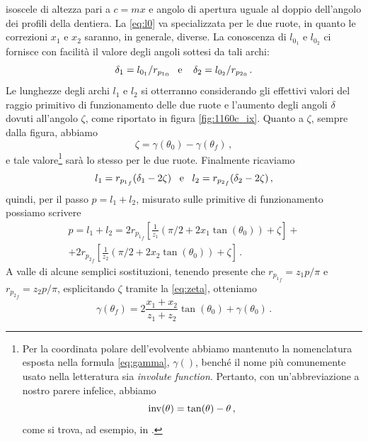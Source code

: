 isoscele di altezza pari a $c=mx$ e angolo di apertura uguale al 
doppio dell'angolo dei profili della dentiera. La \ref{eq:l0} va specializzata
per le due ruote, in quanto le correzioni $x_1$ e $x_2$ saranno,
in generale, 
diverse. La conoscenza di $l_{0_1}$ e $l_{0_2}$ ci fornisce con facilit\`a
il valore degli angoli sottesi da tali archi:
\begin{equation}
\delta_1 = l_{0_1}/r_{{p_1}_0}\;\;\; {\rm e} \;\;\;\;
\delta_2 = l_{0_2}/r_{{p_2}_0}\,.
\label{eq:delta}
\end{equation}
\noindent Le lunghezze degli archi $l_1$ e $l_2$ si otterranno considerando
gli effettivi valori del raggio primitivo di funzionamento delle due ruote 
e l'aumento degli angoli $\delta$ dovuti all'angolo $\zeta$, come riportato
in figura \ref{fig:1160c_ix}.
Quanto a $\zeta$, sempre dalla figura, abbiamo
\begin{equation}
\zeta= \gamma(\theta_0)-\gamma(\theta_f)\,,
\label{eq:zeta}
\end{equation}
\noindent e tale valore\footnote{
Per la coordinata polare dell'evolvente abbiamo mantenuto la nomenclatura
esposta nella formula \ref{eq:gamma}, $\gamma()$, bench\'e
il nome pi\`u comunemente usato nella letteratura sia {\em involute
function}. Pertanto, con un'abbreviazione a nostro
parere infelice, abbiamo
\begin{equation}
 {\rm inv}(\theta) = \tan(\theta)-\theta \,,
\label{eq:inv}
\end{equation}
come si trova, ad esempio, in \cite{henriot}.
} sar\`a lo stesso per le due ruote. Finalmente ricaviamo
\begin{equation}
l_1= r_{{p_1}_f} (\delta_1-2\zeta)\;\;\; {\rm e} \;\;\; l_2= r_{{p_2}_f} (\delta_2-2\zeta)\,,
\label{eq:l1l2}
\end{equation}
\noindent quindi, per il passo $p=l_1+l_2$, misurato sulle primitive di 
funzionamento possiamo scrivere
\begin{multline}
p= l_1+l_2= 
2 r_{{p_1}_f}[ \frac{1}{z_1} (\pi/2 + 2 x_1 \tan(\theta_0)) + \zeta] +\\
+2 r_{{p_2}_f}[ \frac{1}{z_2} (\pi/2 + 2 x_2 \tan(\theta_0)) + \zeta]\,.
\end{multline} 
\noindent A valle di alcune semplici sostituzioni, tenendo presente 
che $r_{{p_1}_f}= z_1 p/\pi$ e $r_{{p_2}_f}= z_2 p/\pi$,
esplicitando $\zeta$ tramite la \ref{eq:zeta}, otteniamo
\begin{equation}
\gamma(\theta_f)=2 \frac{x_1+x_2}{z_1+z_2}\tan(\theta_0) +\gamma(\theta_0)\,.
\label{eq:thetaf}
\end{equation}
